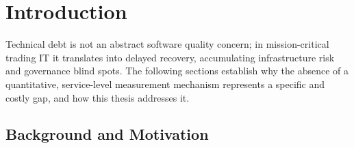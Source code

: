 \documentclass[
  12pt,
  letterpaper,
  12pt,
  oneside,
  english,
  onehalfspacing,
  headsepline]{MastersDoctoralThesis}
\begin{document}
\listoftables %

\endgroup



\clearpage





\clearpage





\mainmatter %

\pagestyle{thesis} %
\newcommand{\keyword}[1]{\textbf{#1}}
\newcommand{\tabhead}[1]{\textbf{#1}}
\newcommand{\code}[1]{\texttt{#1}}
\newcommand{\file}[1]{\texttt{\bfseries#1}}
\newcommand{\option}[1]{\texttt{\itshape#1}}



\chapter{Introduction}\label{sec-chapter1}

Technical debt is not an abstract software quality concern; in
mission-critical trading IT it translates into delayed recovery,
accumulating infrastructure risk and governance blind spots. The
following sections establish why the absence of a quantitative,
service-level measurement mechanism represents a specific and costly
gap, and how this thesis addresses it.

\section{Background and Motivation}\label{background-and-motivation}
\end{document}
